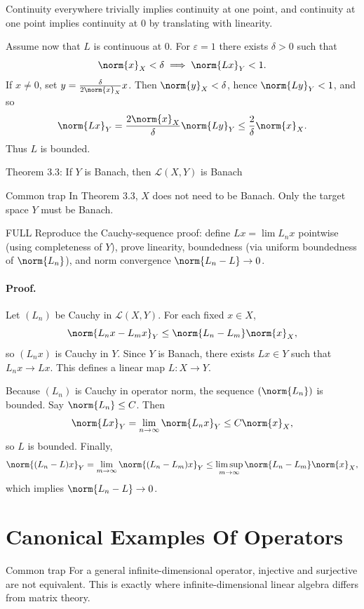 \documentclass[header={Lecture 2 Exam Study Notes}]{study-note}
\begin{document}
Continuity everywhere trivially implies continuity at one point, and continuity at one point implies continuity at $0$ by translating with linearity.

Assume now that $L$ is continuous at $0$. For $\varepsilon=1$ there exists $\delta>0$ such that
\[
\norm{x}_X<\delta \implies \norm{Lx}_Y<1.
\]
If $x\neq 0$, set $y=\frac{\delta}{2\norm{x}_X}x$. Then $\norm{y}_X<\delta$, hence $\norm{Ly}_Y<1$, and so
\[
\norm{Lx}_Y=\frac{2\norm{x}_X}{\delta}\norm{Ly}_Y\le \frac{2}{\delta}\norm{x}_X.
\]
Thus $L$ is bounded.

\begin{thmbox}{Theorem 3.3: If $Y$ is Banach, then $\mathcal L(X,Y)$ is Banach}
\thmDualIsBanach
\end{thmbox}

\begin{warningbox}{Common trap}
In Theorem 3.3, $X$ does not need to be Banach. Only the target space $Y$ must be Banach.
\end{warningbox}

\begin{prooflevelbox}{FULL}
Reproduce the Cauchy-sequence proof: define $Lx=\lim L_nx$ pointwise (using completeness of $Y$), prove linearity, boundedness (via uniform boundedness of $\norm{L_n}$), and norm convergence $\norm{L_n-L}\to 0$.
\end{prooflevelbox}

\paragraph{Proof.}
Let $(L_n)$ be Cauchy in $\mathcal L(X,Y)$. For each fixed $x\in X$,
\[
\norm{L_nx-L_mx}_Y\le \norm{L_n-L_m}\norm{x}_X,
\]
so $(L_nx)$ is Cauchy in $Y$. Since $Y$ is Banach, there exists $Lx\in Y$ such that $L_nx\to Lx$. This defines a linear map $L:X\to Y$.

Because $(L_n)$ is Cauchy in operator norm, the sequence $(\norm{L_n})$ is bounded. Say $\norm{L_n}\le C$. Then
\[
\norm{Lx}_Y=\lim_{n\to\infty}\norm{L_nx}_Y\le C\norm{x}_X,
\]
so $L$ is bounded. Finally,
\[
\norm{(L_n-L)x}_Y=\lim_{m\to\infty}\norm{(L_n-L_m)x}_Y
\le \limsup_{m\to\infty}\norm{L_n-L_m}\norm{x}_X,
\]
which implies $\norm{L_n-L}\to 0$.

\section{Canonical Examples Of Operators}

\begin{warningbox}{Common trap}
For a general infinite-dimensional operator, injective and surjective are not equivalent. This is exactly where infinite-dimensional linear algebra differs from matrix theory.
\end{warningbox}
\end{document}
